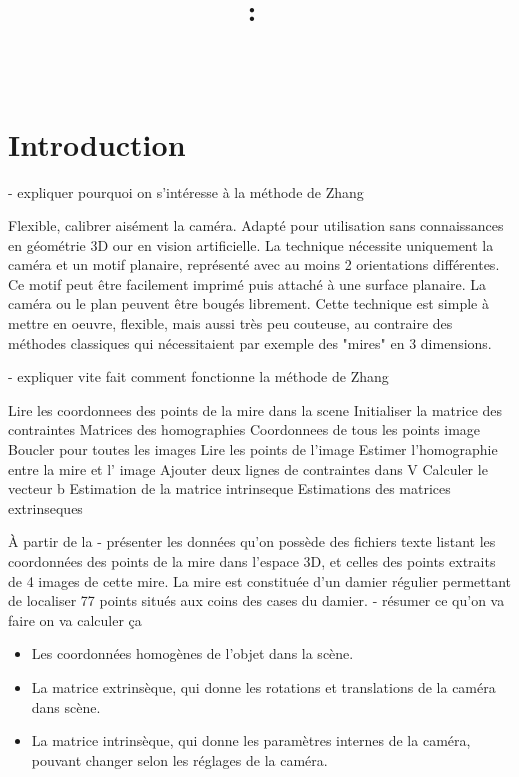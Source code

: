 \documentclass{article}
\title{
\vspace{2in}
\textmd{\textbf{\hmwkClass:\ \hmwkTitle}}\\
\normalsize\vspace{0.1in}\small{\hmwkDueDate}\\
\vspace{3in}
}
\author{\textbf{\hmwkAuthorName}}
\date{} %
\begin{document}
\maketitle



\newpage
\tableofcontents
\newpage


\section{Introduction}

- expliquer pourquoi on s'intéresse à la méthode de Zhang

Flexible, calibrer aisément la caméra.
Adapté pour utilisation sans connaissances en géométrie 3D our en vision artificielle.
La technique nécessite uniquement la caméra et un motif planaire, représenté avec au moins 2 orientations différentes.
Ce motif peut être facilement imprimé puis attaché à une surface planaire.
La caméra ou le plan peuvent être bougés librement.
Cette technique est simple à mettre en oeuvre, flexible, mais aussi très peu couteuse, au contraire des méthodes classiques qui nécessitaient par exemple des "mires" en 3 dimensions.

- expliquer vite fait comment fonctionne la méthode de Zhang

  Lire les coordonnees des points de la mire dans la scene
  Initialiser la matrice des contraintes
  Matrices des homographies
  Coordonnees de tous les points image
  Boucler pour toutes les images
    Lire les points de l'image
    Estimer l'homographie entre la mire et l' image
    Ajouter deux lignes de contraintes dans V
  Calculer le vecteur b
  Estimation de la matrice intrinseque
  Estimations des matrices extrinseques

À partir de la
- présenter les données qu'on possède
   des fichiers texte listant les coordonnées des points de la mire dans l'espace 3D, et celles des points extraits de 4 images de cette mire. La mire est constituée d'un damier régulier permettant de localiser 77 points situés aux coins des cases du damier.
- résumer ce qu'on va faire
on va calculer ça
  \begin{itemize}
 \item Les coordonnées homogènes de l'objet dans la scène.
 \item La matrice extrinsèque, qui donne les rotations et translations de la caméra dans scène.
 \item La matrice intrinsèque, qui donne les paramètres internes de la caméra, pouvant changer
 selon les réglages de la caméra.\\
\end{itemize}
\end{document}
